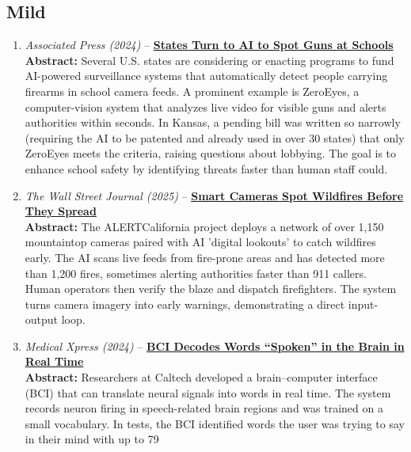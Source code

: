 \documentclass[12pt]{article}
\begin{document}
\subsection*{Mild}
\begin{enumerate}[label=\arabic*.]
  \item \textit{Associated Press (2024)} -- \href{https://technews.acm.org/archives.cfm?fo=2024-05-may#15}{\textbf{States Turn to AI to Spot Guns at Schools}}\\
\footnotesize\textbf{Abstract:} Several U.S. states are considering or enacting programs to fund AI-powered surveillance systems that automatically detect people carrying firearms in school camera feeds. A prominent example is ZeroEyes, a computer-vision system that analyzes live video for visible guns and alerts authorities within seconds. In Kansas, a pending bill was written so narrowly (requiring the AI to be patented and already used in over 30 states) that only ZeroEyes meets the criteria, raising questions about lobbying. The goal is to enhance school safety by identifying threats faster than human staff could.\\

 \item \textit{The Wall Street Journal (2025)} -- \href{https://technews.acm.org/archives.cfm?fo=2025-03-mar#33}{\textbf{Smart Cameras Spot Wildfires Before They Spread}}\\
\footnotesize\textbf{Abstract:} The ALERTCalifornia project deploys a network of over 1,150 mountaintop cameras paired with AI 'digital lookouts' to catch wildfires early. The AI scans live feeds from fire-prone areas and has detected more than 1,200 fires, sometimes alerting authorities faster than 911 callers. Human operators then verify the blaze and dispatch firefighters. The system turns camera imagery into early warnings, demonstrating a direct input-output loop.\\

 \item \textit{Medical Xpress (2024)} -- \href{https://technews.acm.org/archives.cfm?fo=2024-05-may#16}{\textbf{BCI Decodes Words “Spoken” in the Brain in Real Time}}\\
\footnotesize\textbf{Abstract:} Researchers at Caltech developed a brain–computer interface (BCI) that can translate neural signals into words in real time. The system records neuron firing in speech-related brain regions and was trained on a small vocabulary. In tests, the BCI identified words the user was trying to say in their mind with up to 79%


\end{enumerate}
\end{document}
